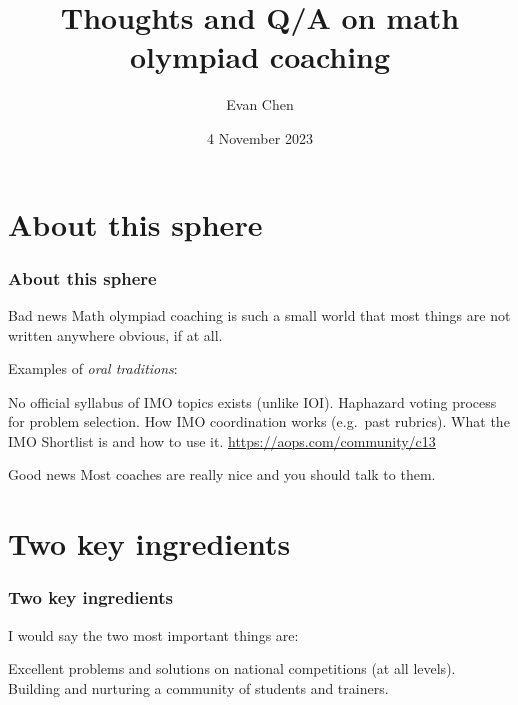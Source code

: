 \documentclass[11pt]{beamer}
\begin{document}
\title{Thoughts and Q/A on math olympiad coaching}
\subtitle{}
\author{Evan Chen}
\date{4 November 2023}

\maketitle

\section{About this sphere}
\begin{frame}
  \frametitle{About this sphere}
  \begin{alertblock}{Bad news}
    Math olympiad coaching is such a small world that
    most things are not written anywhere obvious, if at all.
  \end{alertblock}
  \pause
  Examples of \emph{oral traditions}:
  \begin{itemize}
    \ii No official syllabus of IMO topics exists (unlike IOI).
    \ii Haphazard voting process for problem selection.
    \ii How IMO coordination works (e.g.\ past rubrics).
    \ii What the IMO Shortlist is and how to use it.
    \ii \url{https://aops.com/community/c13}
  \end{itemize}
  \pause
  \begin{exampleblock}{Good news}
    Most coaches are really nice and you should talk to them.
  \end{exampleblock}
\end{frame}

\section{Two key ingredients}
\begin{frame}
  \frametitle{Two key ingredients}
  I would say the \alert{two most important things} are:
  \begin{itemize}
    \ii Excellent problems and solutions on national competitions (at all levels).
    \ii Building and nurturing a community of students and trainers.
  \end{itemize}
\end{frame}
\end{document}
